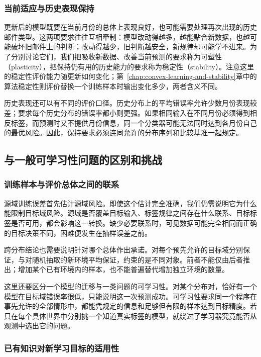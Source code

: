 \subsubsection{当前适应与历史表现保持}

更新后的模型既要在当前月份的总体上表现良好，也可能需要处理再次出现的历史邮件类型。这两项要求往往互相牵制：模型改动得越多，越能贴合新数据，也越可能破坏旧邮件上的判断；改动得越少，旧判断越安全，新规律却可能学不进来。为了分别讨论它们，我们把吸收新数据、改善当前预测的要求称为可塑性（plasticity），把保持仍有用的历史能力的要求称为稳定性（stability）。注意这里的稳定性评价能力随更新如何变化；第~\ref{chap:convex-learning-and-stability}章中的算法稳定性则评价替换一个训练样本时输出变化多少，两者含义不同。

历史表现还可以有不同的评价口径。历史分布上的平均错误率允许少数月份表现较差；要求每个历史分布的错误率都小则更强。如果相同输入在不同月份必须得到相反标签，而预测时又不提供月份信息，同一个分类器可能无法同时达到各月份自己的最优风险。因此，保持要求必须连同允许的分布序列和比较基准一起规定。

\subsection{与一般可学习性问题的区别和挑战}
\label{sec:transfer-continual-challenges}

\subsubsection{训练样本与评价总体之间的联系}

源域训练误差首先估计源域风险。即使这个估计完全准确，我们仍需说明它为什么能限制目标域风险。源域是否覆盖目标输入、标签规律之间存在什么联系、目标标签是否可用，都会影响这一转换。缺少必要联系时，可见数据可能完全相同而正确的目标决策不同，困难便发生在抽样误差之前。

跨分布结论也需要说明针对哪个总体作出承诺。对每个预先允许的目标域分别保证，与对随机抽取的新环境平均保证，约束的是不同对象。前者不能仅由后者推出；增加某个已有环境内的样本，也不能普遍替代增加独立环境的数量。

这里还要区分一个模型的迁移与一类问题的可学习性。对某个分布对，恰好有一个模型在目标域错误率很低，只能说明这一次预测成功。可学习性要求同一个程序在事先允许的全部情形中，都能凭规定的信息和足够但有限的样本达到目标精度。若只在每个具体世界中分别挑一个知道真实标签的模型，就绕过了学习器究竟能否从观测中选出它的问题。

\subsubsection{已有知识对新学习目标的适用性}

